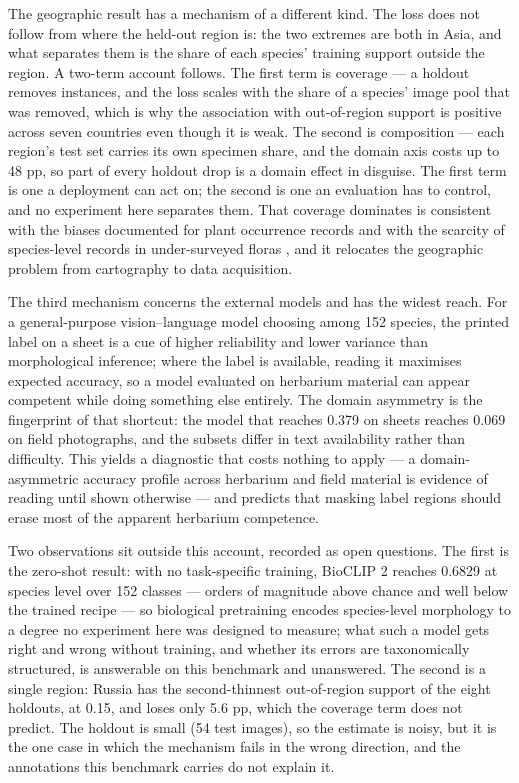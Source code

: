 \documentclass[preprint,12pt,authoryear]{elsarticle}
\begin{document}
The geographic result has a mechanism of a different kind. The loss does not follow from where the held-out region is: the two extremes are both in Asia, and what separates them is the share of each species' training support outside the region. A two-term account follows. The first term is coverage --- a holdout removes instances, and the loss scales with the share of a species' image pool that was removed, which is why the association with out-of-region support is positive across seven countries even though it is weak. The second is composition --- each region's test set carries its own specimen share, and the domain axis costs up to 48 pp, so part of every holdout drop is a domain effect in disguise. The first term is one a deployment can act on; the second is one an evaluation has to control, and no experiment here separates them. That coverage dominates is consistent with the biases documented for plant occurrence records \citep{meyer2016} and with the scarcity of species-level records in under-surveyed floras \citep{scheffers2012}, and it relocates the geographic problem from cartography to data acquisition.

The third mechanism concerns the external models and has the widest reach. For a general-purpose vision--language model choosing among 152 species, the printed label on a sheet is a cue of higher reliability and lower variance than morphological inference; where the label is available, reading it maximises expected accuracy, so a model evaluated on herbarium material can appear competent while doing something else entirely. The domain asymmetry is the fingerprint of that shortcut: the model that reaches 0.379 on sheets reaches 0.069 on field photographs, and the subsets differ in text availability rather than difficulty. This yields a diagnostic that costs nothing to apply --- a domain-asymmetric accuracy profile across herbarium and field material is evidence of reading until shown otherwise --- and predicts that masking label regions should erase most of the apparent herbarium competence.

Two observations sit outside this account, recorded as open questions. The first is the zero-shot result: with no task-specific training, BioCLIP 2 reaches 0.6829 at species level over 152 classes --- orders of magnitude above chance and well below the trained recipe --- so biological pretraining encodes species-level morphology to a degree no experiment here was designed to measure; what such a model gets right and wrong without training, and whether its errors are taxonomically structured, is answerable on this benchmark and unanswered. The second is a single region: Russia has the second-thinnest out-of-region support of the eight holdouts, at 0.15, and loses only 5.6 pp, which the coverage term does not predict. The holdout is small (54 test images), so the estimate is noisy, but it is the one case in which the mechanism fails in the wrong direction, and the annotations this benchmark carries do not explain it.
\end{document}
